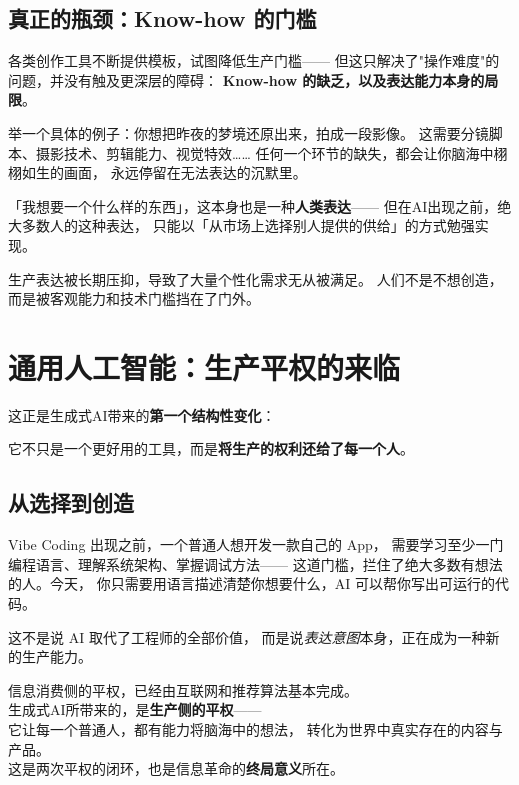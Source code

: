 \documentclass[12pt, a4paper, openany]{book}
\newcommand{\key}[1]{\textbf{\color{AccentBlue}#1}}
\newcommand{\emphasis}[1]{\textit{\color{AccentGold}#1}}
\begin{document}
\vspace{6pt}

\subsection{真正的瓶颈：Know-how 的门槛}

各类创作工具不断提供模板，试图降低生产门槛——
但这只解决了"操作难度"的问题，并没有触及更深层的障碍：
\key{Know-how 的缺乏，以及表达能力本身的局限}。

举一个具体的例子：你想把昨夜的梦境还原出来，拍成一段影像。
这需要分镜脚本、摄影技术、剪辑能力、视觉特效……
任何一个环节的缺失，都会让你脑海中栩栩如生的画面，
永远停留在无法表达的沉默里。

\begin{blockquote}
「我想要一个什么样的东西」，这本身也是一种\textbf{人类表达}——
但在AI出现之前，绝大多数人的这种表达，
只能以「从市场上选择别人提供的供给」的方式勉强实现。
\end{blockquote}

生产表达被长期压抑，导致了大量个性化需求无从被满足。
人们不是不想创造，而是被客观能力和技术门槛挡在了门外。

\section{通用人工智能：生产平权的来临}

这正是生成式AI带来的\key{第一个结构性变化}：

它不只是一个更好用的工具，而是\key{将生产的权利还给了每一个人}。

\subsection{从选择到创造}

Vibe Coding 出现之前，一个普通人想开发一款自己的 App，
需要学习至少一门编程语言、理解系统架构、掌握调试方法——
这道门槛，拦住了绝大多数有想法的人。今天，
你只需要用语言描述清楚你想要什么，AI 可以帮你写出可运行的代码。

这不是说 AI 取代了工程师的全部价值，
而是说\emphasis{表达意图}本身，正在成为一种新的生产能力。

\begin{coreview}
信息消费侧的平权，已经由互联网和推荐算法基本完成。\\[4pt]
生成式AI所带来的，是\textbf{生产侧的平权}——\\
它让每一个普通人，都有能力将脑海中的想法，
转化为世界中真实存在的内容与产品。\\[4pt]
这是两次平权的闭环，也是信息革命的\textbf{终局意义}所在。
\end{coreview}
\end{document}
